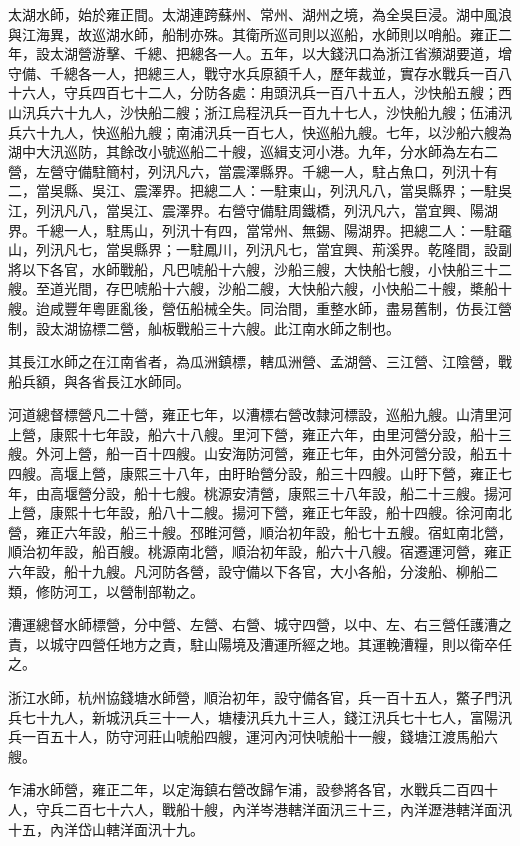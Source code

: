 \begin{pinyinscope}
太湖水師，始於雍正間。太湖連跨蘇州、常州、湖州之境，為全吳巨浸。湖中風浪與江海異，故巡湖水師，船制亦殊。其衛所巡司則以巡船，水師則以哨船。雍正二年，設太湖營游擊、千總、把總各一人。五年，以大錢汛口為浙江省瀕湖要道，增守備、千總各一人，把總三人，戰守水兵原額千人，歷年裁並，實存水戰兵一百八十六人，守兵四百七十二人，分防各處：甪頭汛兵一百八十五人，沙快船五艘；西山汛兵六十九人，沙快船二艘；浙江烏程汛兵一百九十七人，沙快船九艘；伍浦汛兵六十九人，快巡船九艘；南浦汛兵一百七人，快巡船九艘。七年，以沙船六艘為湖中大汛巡防，其餘改小號巡船二十艘，巡緝支河小港。九年，分水師為左右二營，左營守備駐簡村，列汛凡六，當震澤縣界。千總一人，駐占魚口，列汛十有二，當吳縣、吳江、震澤界。把總二人：一駐東山，列汛凡八，當吳縣界；一駐吳江，列汛凡八，當吳江、震澤界。右營守備駐周鐵橋，列汛凡六，當宜興、陽湖界。千總一人，駐馬山，列汛十有四，當常州、無錫、陽湖界。把總二人：一駐黿山，列汛凡七，當吳縣界；一駐鳳川，列汛凡七，當宜興、荊溪界。乾隆間，設副將以下各官，水師戰船，凡巴唬船十六艘，沙船三艘，大快船七艘，小快船三十二艘。至道光間，存巴唬船十六艘，沙船二艘，大快船六艘，小快船二十艘，槳船十艘。迨咸豐年粵匪亂後，營伍船械全失。同治間，重整水師，盡易舊制，仿長江營制，設太湖協標二營，舢板戰船三十六艘。此江南水師之制也。

其長江水師之在江南省者，為瓜洲鎮標，轄瓜洲營、孟湖營、三江營、江陰營，戰船兵額，與各省長江水師同。

河道總督標營凡二十營，雍正七年，以漕標右營改隸河標設，巡船九艘。山清里河上營，康熙十七年設，船六十八艘。里河下營，雍正六年，由里河營分設，船十三艘。外河上營，船一百十四艘。山安海防河營，雍正七年，由外河營分設，船五十四艘。高堰上營，康熙三十八年，由盱眙營分設，船三十四艘。山盱下營，雍正七年，由高堰營分設，船十七艘。桃源安清營，康熙三十八年設，船二十三艘。揚河上營，康熙十七年設，船八十二艘。揚河下營，雍正七年設，船十四艘。徐河南北營，雍正六年設，船三十艘。邳睢河營，順治初年設，船七十五艘。宿虹南北營，順治初年設，船百艘。桃源南北營，順治初年設，船六十八艘。宿遷運河營，雍正六年設，船十九艘。凡河防各營，設守備以下各官，大小各船，分浚船、柳船二類，修防河工，以營制部勒之。

漕運總督水師標營，分中營、左營、右營、城守四營，以中、左、右三營任護漕之責，以城守四營任地方之責，駐山陽境及漕運所經之地。其運輓漕糧，則以衛卒任之。

浙江水師，杭州協錢塘水師營，順治初年，設守備各官，兵一百十五人，鱉子門汛兵七十九人，新城汛兵三十一人，塘棲汛兵九十三人，錢江汛兵七十七人，富陽汛兵一百五十人，防守河莊山唬船四艘，運河內河快唬船十一艘，錢塘江渡馬船六艘。

乍浦水師營，雍正二年，以定海鎮右營改歸乍浦，設參將各官，水戰兵二百四十人，守兵二百七十六人，戰船十艘，內洋岑港轄洋面汛三十三，內洋瀝港轄洋面汛十五，內洋岱山轄洋面汛十九。


\end{pinyinscope}
